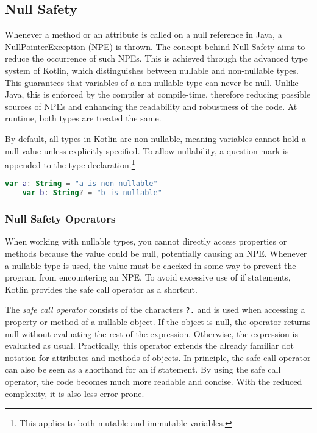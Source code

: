 \documentclass[a4paper, 11pt]{article}
\begin{document}
\subsection{Null Safety}
  Whenever a method or an attribute is called on a null reference in Java, a NullPointerException (NPE) is thrown. The concept behind Null Safety aims to reduce the occurrence of such NPEs. This is achieved through the advanced type system of Kotlin, which distinguishes between nullable and non-nullable types. This guarantees that variables of a non-nullable type can never be null. Unlike Java, this is enforced by the compiler at compile-time, therefore reducing possible sources of NPEs and enhancing the readability and robustness of the code. At runtime, both types are treated the same.
  
  By default, all types in Kotlin are non-nullable, meaning variables cannot hold a null value unless explicitly specified. To allow nullability, a question mark is appended to the type declaration.\footnote{This applies to both mutable and immutable variables.}

  \begin{lstlisting}[language=Kotlin]
    var a: String = "a is non-nullable"
    var b: String? = "b is nullable"
  \end{lstlisting}
  
\subsubsection{Null Safety Operators}
  When working with nullable types, you cannot directly access properties or methods because the value could be null, potentially causing an NPE. Whenever a nullable type is used, the value must be checked in some way to prevent the program from encountering an NPE. To avoid excessive use of if statements, Kotlin provides the safe call operator as a shortcut.

  The \textit{safe call operator} consists of the characters \texttt{?.} and is used when accessing a property or method of a nullable object. If the object is null, the operator returns null without evaluating the rest of the expression. Otherwise, the expression is evaluated as usual. Practically, this operator extends the already familiar dot notation for attributes and methods of objects. In principle, the safe call operator can also be seen as a shorthand for an if statement. By using the safe call operator, the code becomes much more readable and concise. With the reduced complexity, it is also less error-prone.
\end{document}
